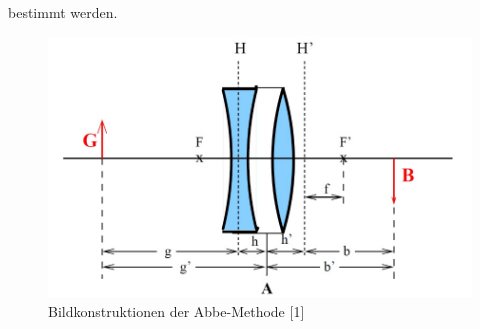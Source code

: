   bestimmt werden.

  \begin{figure} [H]
    \centering
    \includegraphics[scale=0.3]{content/bild4.png}
    \caption{Bildkonstruktionen der Abbe-Methode [1]}
    \label{fig:bild4}
  \end{figure}














